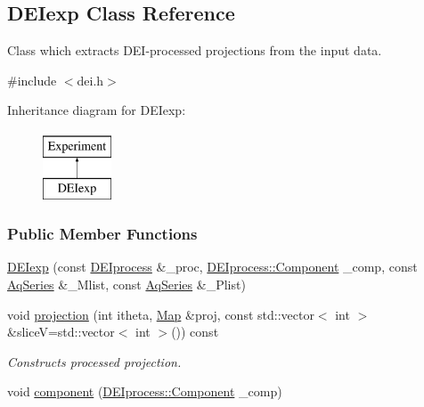 \hypertarget{classDEIexp}{
\subsection{DEIexp Class Reference}
\label{classDEIexp}
}


Class which extracts DEI-\/processed projections from the input data.  




{\ttfamily \#include $<$dei.h$>$}

Inheritance diagram for DEIexp:\begin{figure}[H]
\begin{center}
\leavevmode
\includegraphics[height=2.000000cm]{classDEIexp}
\end{center}
\end{figure}
\subsubsection*{Public Member Functions}
\begin{DoxyCompactItemize}
\item 
\hyperlink{classDEIexp_ae6c1728c51bc3e4650dffdd810903fd8}{DEIexp} (const \hyperlink{classDEIprocess}{DEIprocess} \&\_\-proc, \hyperlink{classDEIprocess_a3a41867d8f9d10e77541ae8484256cd2}{DEIprocess::Component} \_\-comp, const \hyperlink{classAqSeries}{AqSeries} \&\_\-Mlist, const \hyperlink{classAqSeries}{AqSeries} \&\_\-Plist)
\item 
void \hyperlink{classDEIexp_adf11fec5b7b48bde1253a4548debfd59}{projection} (int itheta, \hyperlink{group__Types_ga8747378c016fc11d9ecbb98787248c25}{Map} \&proj, const std::vector$<$ int $>$ \&sliceV=std::vector$<$ int $>$()) const 
\begin{DoxyCompactList}\small\item\em Constructs processed projection. \item\end{DoxyCompactList}\item 
void \hyperlink{classDEIexp_a7f574cb4b3849668f7f212ed3c3a0751}{component} (\hyperlink{classDEIprocess_a3a41867d8f9d10e77541ae8484256cd2}{DEIprocess::Component} \_\-comp)
\end{DoxyCompactItemize}
